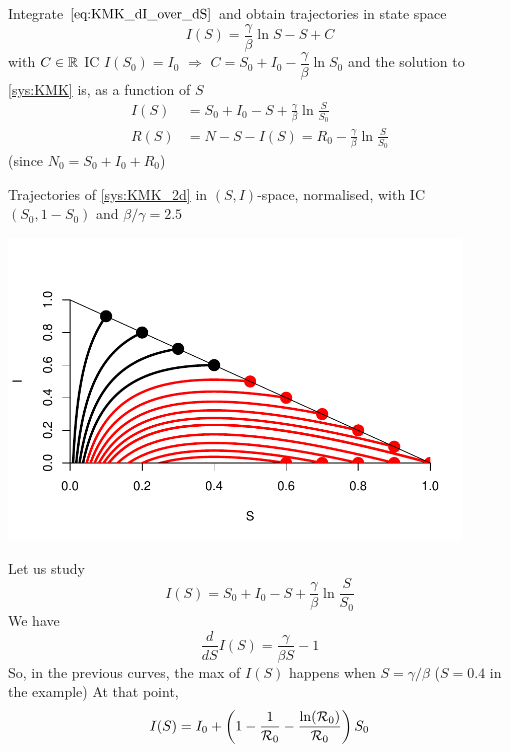 \documentclass[aspectratio=169]{beamer}\usepackage[]{graphicx}\usepackage[]{xcolor}
\begin{document}
\begin{frame}{}
  Integrate $\eqref{eq:KMK_dI_over_dS}$ and obtain trajectories in state space
  $$
  I(S)=\frac\gamma\beta \ln S-S+C
  $$
  with $C\in\mathbb{R}$
  \vfill
  IC $I(S_0)=I_0$ $\Rightarrow$ $C=S_0+I_0-\dfrac \gamma\beta \ln S_0$ and the solution to \eqref{sys:KMK} is, as a function of $S$
  \begin{align*}
  I(S)&=S_0+I_0-S+\frac\gamma\beta \ln \frac S{S_0} \\
  R(S)&=N-S-I(S)=R_0-\frac\gamma\beta \ln \frac S{S_0}
  \end{align*}
  (since $N_0=S_0+I_0+R_0$)
\end{frame}




\begin{frame}
Trajectories of \eqref{sys:KMK_2d} in $(S,I)$-space, normalised, with IC $(S_0,1-S_0)$ and $\beta/\gamma=2.5$
\vfill
\begin{center}
\includegraphics[width=0.9\textwidth]{FIGS/L04-KMK_SI_plane-1.pdf}
\end{center}
\end{frame}



\begin{frame}{}
  Let us study
  $$
  I(S)=S_0+I_0-S+\frac\gamma\beta \ln \frac S{S_0} 
  $$
  We have
  $$
  \frac{d}{dS}I(S) = \frac{\gamma}{\beta S}-1
  $$
  So, in the previous curves, the max of $I(S)$ happens when $S=\gamma/\beta$ ($S=0.4$ in the example)
  \vfill
  At that point,
  $$
  I(S) = I_0+\left(
    1-\frac{1}{\mathcal{R}_0} - \frac{\ln(\mathcal{R}_0)}{\mathcal{R}_0}
  \right)S_0
  $$
\end{frame}
\end{document}
